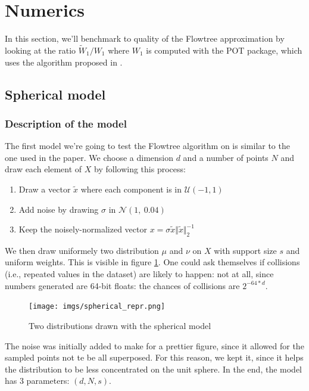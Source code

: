 \documentclass[11pt]{article}
\begin{document}
\newpage
\section{Numerics}\label{sec:Numerics}

In this section, we'll benchmark to quality of the Flowtree approximation by looking at the ratio $\widetilde{W}_1 / W_1$ where $W_1$ is computed with the \textsf{POT} \cite{POT} package, which uses the algorithm proposed in \cite{POTalgo}.

\subsection{Spherical model}

\subsubsection{Description of the model}

The first model we're going to test the Flowtree algorithm on is similar to the one used in the paper. We choose a dimension $d$ and a number of points $N$ and draw each element of $X$ by following this process:

\begin{enumerate}
\item Draw a vector $\tilde{x}$ where each component is in $\mathcal{U}(-1, 1)$
\item Add noise by drawing $\sigma$ in $\mathcal{N}(1,~ 0.04)$
\item Keep the noisely-normalized vector $x = \sigma \tilde{x} \Vert \tilde{x} \Vert^{-1}_2$
\end{enumerate}

We then draw uniformely two distribution $\mu$ and $\nu$ on $X$ with support size $s$ and uniform weights. This is visible in figure \ref{spherical_repr}. One could ask themselves if collisions (i.e., repeated values in the dataset) are likely to happen: not at all, since numbers generated are 64-bit floats: the chances of collisions are $2^{-64*d}$.

\begin{figure}[h]
\centering
\texttt{[image: imgs/spherical\_repr.png]}
\caption{Two distributions drawn with the spherical model}
\label{spherical_repr}
\end{figure}

The noise was initially added to make for a prettier figure, since it allowed for the sampled points not te be all superposed. For this reason, we kept it, since it helps the distribution to be less concentrated on the unit sphere. In the end, the model has 3 parameters: $(d, N, s)$.
\end{document}
